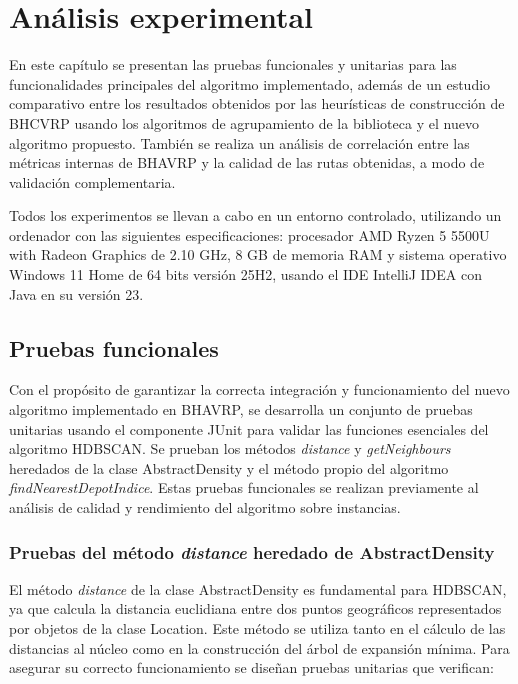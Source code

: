 \chapter{An\'alisis experimental}

En este cap\'itulo se presentan las pruebas funcionales y unitarias para las funcionalidades principales del algoritmo implementado, adem\'as de un estudio comparativo entre los resultados obtenidos por las heurísticas de construcción de BHCVRP usando los algoritmos de agrupamiento de la biblioteca y el nuevo algoritmo propuesto. Tambi\'en se realiza un an\'alisis de correlaci\'on entre las m\'etricas internas de BHAVRP y la calidad de las rutas obtenidas, a modo de validaci\'on complementaria.

Todos los experimentos se llevan a cabo en un entorno controlado, utilizando un ordenador con las siguientes especificaciones: procesador AMD Ryzen 5 5500U with Radeon Graphics de 2.10 GHz, 8 GB de memoria RAM y sistema operativo Windows 11 Home de 64 bits versión 25H2, usando el IDE IntelliJ IDEA con Java en su versi\'on 23.

\section{Pruebas funcionales}

Con el prop\'osito de garantizar la correcta integraci\'on y funcionamiento del nuevo algoritmo implementado en BHAVRP, se desarrolla un conjunto de pruebas unitarias usando el componente JUnit para validar las funciones esenciales del algoritmo HDBSCAN. Se prueban los m\'etodos \textit{distance} y \textit{getNeighbours} heredados de la clase AbstractDensity y el método propio del algoritmo \textit{findNearestDepotIndice}. Estas pruebas funcionales se realizan previamente al an\'alisis de calidad y rendimiento del algoritmo sobre instancias.

\subsection{Pruebas del m\'etodo \textit{distance} heredado de AbstractDensity}

El m\'etodo \textit{distance} de la clase AbstractDensity es fundamental para HDBSCAN, ya que calcula la distancia euclidiana entre dos puntos geogr\'aficos representados por objetos de la clase Location. Este m\'etodo se utiliza tanto en el c\'alculo de las distancias al n\'ucleo como en la construcci\'on del \'arbol de expansi\'on m\'inima. Para asegurar su correcto funcionamiento se dise\~nan pruebas unitarias que verifican:

